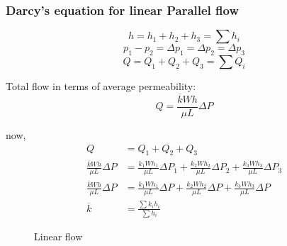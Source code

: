 \documentclass{article}
\begin{document}
    \subsubsection*{Darcy’s equation for linear Parallel flow}
    $$h = h_1 + h_2 + h_3 = \sum h_i$$
    $$p_1 - p_2 = \Delta p_1 = \Delta p_2 = \Delta p_3$$
    $$Q = Q_1 + Q_2 + Q_3 = \sum Q_i$$

    Total flow in terms of average permeability:
    $$Q = \frac{\overline{k}Wh}{\mu L} \Delta P $$

    now,
    \begin{align*}
        Q &= Q_1 + Q_2 + Q_3 \\
        \frac{\overline{k}Wh}{\mu L} \Delta P  &= \frac{k_1Wh_1}{\mu L} \Delta P_1 + \frac{k_2Wh_2}{\mu L} \Delta P_2 + \frac{k_3Wh_3}{\mu L} \Delta P_3 \\
        \frac{\overline{k}Wh}{\mu L} \Delta P  &= \frac{k_1Wh_1}{\mu L} \Delta P + \frac{k_2Wh_2}{\mu L} \Delta P + \frac{k_3Wh_3}{\mu L} \Delta P \\ 
        \overline{k} &= \frac{\sum k_ih_i}{\sum h_i}
    \end{align*}

    \begin{figure}[h]
        \centering
      
        \hfill
    
        \caption{Linear flow}
        \label{fig:Linear flow}
      \end{figure}
\end{document}
